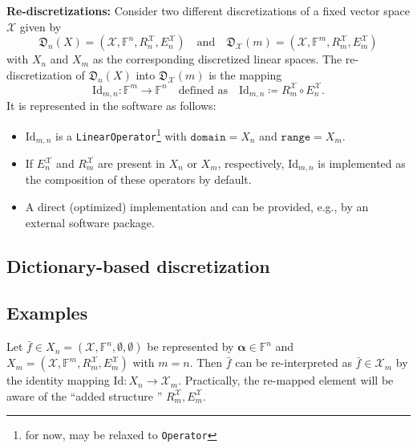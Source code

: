 \documentclass[a4paper]{paper}
\newcommand*{\SPC}[1]{{\ensuremath{\mathscr{#1}}}}
\newcommand*{\SPCX}{\SPC{X}}
\newcommand*{\FIELD}{{\ensuremath{\mathbb{F}}}}
\newcommand*{\Fn}{{\ensuremath{\FIELD^n}}}
\newcommand*{\Fm}{{\ensuremath{\FIELD^m}}}
\newcommand*{\OP}[1]{{\ensuremath{\mathcal{#1}}}}
\newcommand*{\OPID}{\OP{\mathrm{Id}}}
\newcommand{\DISCOP}[1]{{\ensuremath{\mathsf{#1}}}}
\newcommand*{\DISCOPID}{\DISCOP{\mathrm{Id}}}
\newcommand*{\EXT}[2]{\ensuremath{E_{#1}^{#2}}}
\newcommand*{\REST}[2]{\ensuremath{R_{#1}^{#2}}}
\newcommand*{\RnX}{{\ensuremath{\REST{n}{\SPC{X}}}}}
\newcommand*{\RmX}{{\ensuremath{\REST{m}{\SPC{X}}}}}
\newcommand*{\EnX}{{\ensuremath{\EXT{n}{\SPC{X}}}}}
\newcommand*{\EmX}{{\ensuremath{\EXT{m}{\SPC{X}}}}}
\newcommand*{\DISCR}[2]{{\ensuremath{\mathfrak{D}_{#1}(#2)}}}
\newcommand*{\DISCRnX}{\DISCR{n}{X}}
\DeclareMathOperator{\DEFEQ}{{\coloneqq}}
\newcommand*{\BDalpha}{\boldsymbol{\alpha}}
\begin{document}
%
\textbf{Re-discretizations:}
Consider two different discretizations of a fixed vector space $\SPCX$ given by 
\[ \DISCRnX = (\SPCX, \Fn, \RnX, \EnX)
   \quad\text{and}\quad
  \DISCR{\SPCX}{m} =(\SPCX, \Fm, \RmX, \EmX)
\]  
with $X_n$ and $X_m$ as the corresponding discretized linear spaces.
The re-discreti\-zation of $\DISCRnX$ into $\DISCR{\SPCX}{m}$ is the mapping 
\[  \DISCOPID_{m,n} \colon \Fm \to \Fn
    \quad\text{defined as}\quad
    \DISCOPID_{m,n} \DEFEQ  \RmX \circ \EnX.
\]   
It is represented in the software as follows:
\begin{itemize}
 \item $\DISCOPID_{m,n}$ is a \texttt{LinearOperator}\footnote{for now, may be relaxed to \texttt{Operator}} with 
 $\mathtt{domain} = X_n$ and $\mathtt{range} = X_m$.
 \item If $\EnX$ and $\RmX$ are present in $X_n$ or $X_m$, respectively, $\DISCOPID_{m,n}$ is implemented as the 
 composition of these operators by default.
 \item A direct (optimized) implementation and can be provided, e.g., by an external software package.
\end{itemize}



\subsection{Dictionary-based discretization}
\label{subsec:soft:dict}




\subsection{Examples}
\label{subsec:soft:examp}

\begin{example}[Re-interpretation]
 Let $\bar f \in X_n = (\SPCX, \Fn, \emptyset, \emptyset)$ be represented by $\BDalpha \in \Fn$ and 
 $X_m = (\SPCX, \Fm, \RmX, \EmX)$ with $m=n$. Then $\bar f$ can be re-interpreted as $\bar f \in \SPCX_m$ by 
 the identity mapping $\OPID \colon X_n \to \SPCX_m$. Practically, the re-mapped element will be aware of the ``added 
 structure '' $\RmX, \EmX$.
\end{example}
\end{document}
